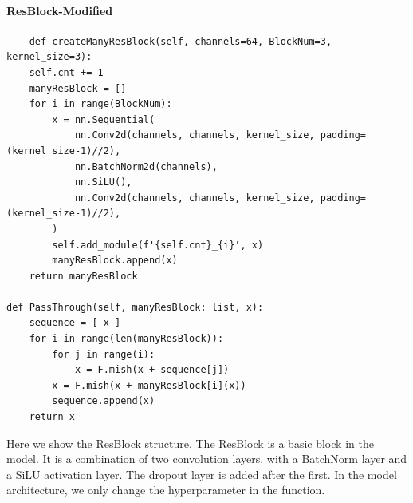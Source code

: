 \documentclass[a4 paper,12pt]{article}
\theoremstyle{definitionstyle}
\begin{document}
\paragraph{ResBlock-Modified}
\begin{verbatim}
    def createManyResBlock(self, channels=64, BlockNum=3, kernel_size=3):
    self.cnt += 1
    manyResBlock = []
    for i in range(BlockNum):
        x = nn.Sequential(
            nn.Conv2d(channels, channels, kernel_size, padding=(kernel_size-1)//2),
            nn.BatchNorm2d(channels),
            nn.SiLU(),
            nn.Conv2d(channels, channels, kernel_size, padding=(kernel_size-1)//2),
        )
        self.add_module(f'{self.cnt}_{i}', x)
        manyResBlock.append(x)
    return manyResBlock

def PassThrough(self, manyResBlock: list, x):
    sequence = [ x ]
    for i in range(len(manyResBlock)):
        for j in range(i):
            x = F.mish(x + sequence[j])
        x = F.mish(x + manyResBlock[i](x))
        sequence.append(x)
    return x
\end{verbatim}
Here we show the ResBlock structure. The ResBlock is a basic block in the model. It is a combination of two convolution layers, with a BatchNorm layer and a SiLU activation layer. The dropout layer is added after the first. In the model architecture, we only change the hyperparameter in the function.
\end{document}
